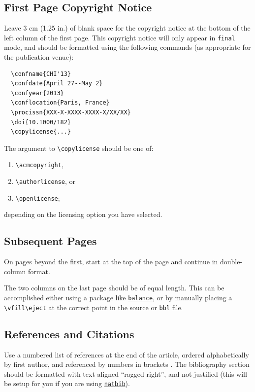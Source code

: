 \documentclass[preprint]{../latex/sigchi-modern}
\begin{document}
\subsection{First Page Copyright Notice}
Leave 3 cm (1.25 in.) of blank space for the copyright notice at the bottom of
the left column of the first page. This copyright notice will only appear in
\texttt{final} mode, and should be formatted using the following commands (as
appropriate for the publication venue):
\begin{verbatim}
  \confname{CHI'13}
  \confdate{April 27--May 2}
  \confyear{2013}
  \conflocation{Paris, France}
  \procissn{XXX-X-XXXX-XXXX-X/XX/XX}
  \doi{10.1000/182}
  \copylicense{...}
\end{verbatim}

The argument to \texttt{\textbackslash copylicense} should be one of:
\begin{enumerate}
  \item\texttt{\textbackslash acmcopyright}, 
  \item\texttt{\textbackslash authorlicense}, or 
  \item\texttt{\textbackslash openlicense}; 
\end{enumerate}
depending on the licensing option you have selected.

\subsection{Subsequent Pages}
On pages beyond the first, start at the top of the page and continue in
double-column format.

The two columns on the last page should be of equal length. This can be 
accomplished either using a package like 
\texttt{\href{http://ctan.org/pkg/balance}{balance}}, or by manually placing
a \texttt{\textbackslash vfill\textbackslash eject} at the correct point in
the source or \texttt{bbl} file.

\subsection{References and Citations}
Use a numbered list of references at the end of the article, ordered
alphabetically by first author, and referenced by numbers in brackets
\cite{Card1983,Card1990,Card1991,Gillick1996}.
The bibliography section should be formatted with text aligned ``ragged right'',
and not justified (this will be setup for you if you are using
\texttt{\href{http://ctan.org/pkg/natbib}{natbib}}).
\end{document}
